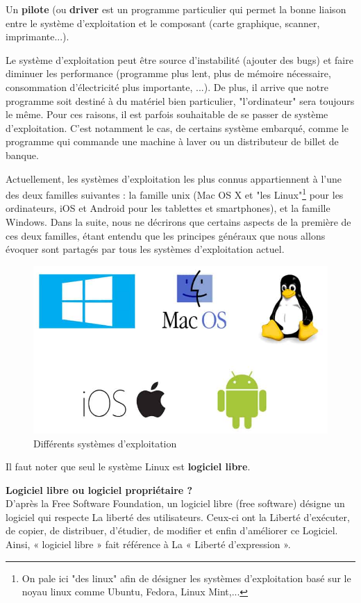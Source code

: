 \begin{mydefinition}
	Un {\bf pilote} (ou {\bf driver} est un programme particulier qui permet la bonne liaison entre le système d'exploitation et le composant (carte graphique, scanner, imprimante...).
	
\end{mydefinition}
\begin{eclairage}
	Le système d'exploitation peut être source d'instabilité (ajouter des bugs) et faire diminuer les performance (programme plus lent, plus de mémoire nécessaire, consommation d'électricité plus importante, ...). De plus, il arrive que notre programme soit destiné à du matériel bien particulier, "l'ordinateur" sera toujours le même. Pour ces raisons, il est parfois souhaitable de se passer de système d'exploitation. C'est notamment le cas, de certains système embarqué, comme le programme qui commande une machine à laver ou un distributeur de billet de banque.
\end{eclairage}
Actuellement, les systèmes d’exploitation les plus connus appartiennent à l’une des deux familles suivantes : la famille unix (Mac OS X et "les Linux"\footnote{On pale ici "des linux" afin de désigner les systèmes d'exploitation basé sur le noyau linux comme Ubuntu, Fedora, Linux Mint,...} pour les ordinateurs, iOS et Android pour les tablettes et smartphones), et la famille Windows. Dans la suite, nous ne décrirons que certains aspects de la première de ces deux familles, étant entendu que les principes généraux que nous allons évoquer sont partagés par tous les
systèmes d’exploitation actuel.

\begin{figure}[h]
	\centering
	\includegraphics[trim=0 0 0 0,scale=.5]{Images/OS/OS}
	\caption{Différents systèmes d'exploitation}
\end{figure}
Il faut noter que seul le système Linux est \textbf{logiciel libre}.
\begin{eclairage}
	\textbf{Logiciel libre ou logiciel propriétaire ?}\\	
	
	D'après la Free Software Foundation, un logiciel libre (free software) désigne un logiciel qui respecte La liberté des utilisateurs. Ceux-ci ont la Liberté d'exécuter, de copier, de distribuer, d'étudier, de modifier et enfin d'améliorer ce Logiciel. Ainsi, « logiciel libre » fait référence à La « Liberté d'expression ».
\end{eclairage}

